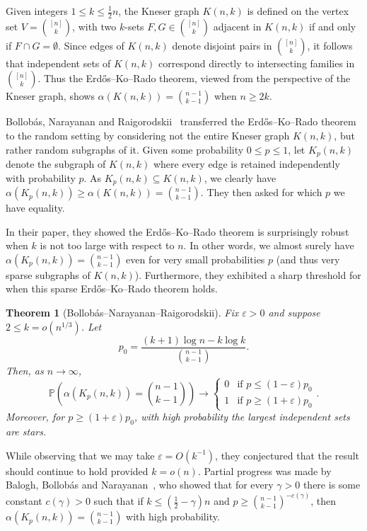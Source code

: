 \documentclass[11pt]{article}
\newtheorem{theorem}{Theorem}[section]
\theoremstyle{definition}
\newcommand{\eps}{\varepsilon}
\newcommand{\3}{\bf{3}}
\newcommand{\Prb}{\mathbb{P}}
\begin{document}
Given integers $1 \le k \le \tfrac12 n$, the Kneser graph $K(n,k)$ is defined on the vertex set $V = \binom{[n]}{k}$, with two $k$-sets $F, G \in \binom{[n]}{k}$ adjacent in $K(n,k)$ if and only if $F \cap G = \emptyset$.  Since edges of $K(n,k)$ denote disjoint pairs in $\binom{[n]}{k}$, it follows that independent sets of $K(n,k)$ correspond directly to intersecting families in $\binom{[n]}{k}$.  Thus the Erd\H{o}s--Ko--Rado theorem, viewed from the perspective of the Kneser graph, shows $\alpha(K(n,k)) = \binom{n-1}{k-1}$ when $n \ge 2k$.

Bollob\'as, Narayanan and Raigorodskii~\cite{bnr14} transferred the Erd\H{o}s--Ko--Rado theorem to the random setting by considering not the entire Kneser graph $K(n,k)$, but rather random subgraphs of it.  Given some probability $0 \le p \le 1$, let $K_p(n,k)$ denote the subgraph of $K(n,k)$ where every edge is retained independently with probability $p$.  As $K_p(n,k) \subseteq K(n,k)$, we clearly have $\alpha(K_p(n,k)) \ge \alpha(K(n,k)) = \binom{n-1}{k-1}$.  They then asked for which $p$ we have equality.

In their paper, they showed the Erd\H{o}s--Ko--Rado theorem is surprisingly robust when $k$ is not too large with respect to $n$.  In other words, we almost surely have $\alpha(K_p(n,k)) = \binom{n-1}{k-1}$ even for very small probabilities $p$ (and thus very sparse subgraphs of $K(n,k)$).  Furthermore, they exhibited a sharp threshold for when this sparse Erd\H{o}s--Ko--Rado theorem holds.

\begin{theorem}[Bollob\'as--Narayanan--Raigorodskii] \label{thm:bnr14}
Fix $\eps > 0$ and suppose $2 \le k = o(n^{1/3})$.  Let
\[ p_0 = \frac{(k+1) \log n - k \log k}{\binom{n-1}{k-1}}. \]
Then, as $n \rightarrow \infty$,
\[ \Prb \left( \alpha(K_p(n,k)) = \binom{n-1}{k-1} \right) \rightarrow \left\{ \begin{array}{ll}
	0 & \textrm{if } p \le (1 - \eps) p_0  \\
	1 & \textrm{if } p \ge (1 + \eps) p_0 
\end{array} \right. . \]
Moreover, for $p \ge (1 + \eps)p_0$, with high probability the largest independent sets are stars.
\end{theorem}

While observing that we may take $\eps = O(k^{-1})$, they conjectured that the result should continue to hold provided $k = o(n)$.  Partial progress was made by Balogh, Bollob\'as and Narayanan~\cite{bbn14}, who showed that for every $\gamma > 0$ there is some constant $c(\gamma) > 0$ such that if $k \le (\tfrac12 - \gamma) n$ and $p \ge \binom{n-1}{k-1}^{-c(\gamma)}$, then $\alpha(K_p(n,k)) = \binom{n-1}{k-1}$ with high probability.
\end{document}
